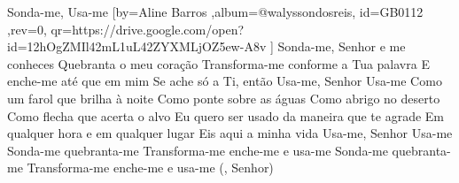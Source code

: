 \beginsong
{Sonda-me, Usa-me %
}[by={Aline Barros %
},album={@walyssondosreis},
id={GB0112 %
},rev={0}, %
qr={https://drive.google.com/open?id=12hOgZMIl42mL1uL42ZYXMLjOZ5ew-A8v %
}]
\beginverse*
Sonda-me, Senhor e me conheces
Quebranta o meu coração
Transforma-me conforme a Tua palavra
E enche-me até que em mim
Se ache só a Ti, então
Usa-me, Senhor
Usa-me
\endverse
\beginchorus
Como um farol que brilha à noite
Como ponte sobre as águas
Como abrigo no deserto
Como flecha que acerta o alvo
Eu quero ser usado da maneira que te agrade
Em qualquer hora e em qualquer lugar
Eis aqui a minha vida
Usa-me, Senhor
Usa-me
\endchorus
\beginverse*
Sonda-me quebranta-me
Transforma-me enche-me e usa-me
Sonda-me quebranta-me
Transforma-me enche-me e usa-me (, Senhor)
\endverse

